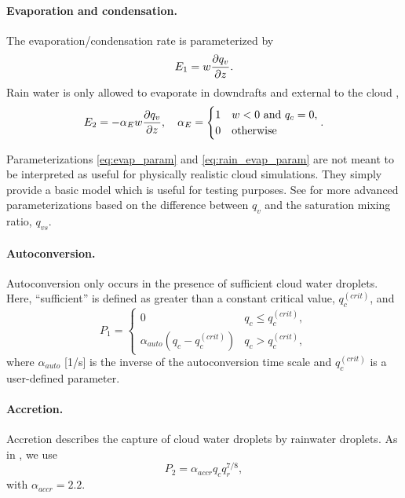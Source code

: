   
\paragraph{Evaporation and condensation.}
The evaporation/condensation rate is parameterized by \cite[eqn.~(5)]{Srivastava1967}
\begin{equation}\label{eq:evap_param}
  E_1 = w\frac{\partial q_v }{\partial z}.
\end{equation}
Rain water is only allowed to evaporate in downdrafts and external to the cloud  \cite[eqn.~(10)]{Srivastava1967},
\begin{equation}\label{eq:rain_evap_param}
  E_2 = -\alpha_E w \frac{\partial q_v }{\partial z}, \quad \alpha_E = \begin{cases} 1 & w<0 \text{ and } q_c = 0,\\
 0 & \text{otherwise}  
 \end{cases}.
\end{equation}

\begin{rem}
Parameterizations \eqref{eq:evap_param} and \eqref{eq:rain_evap_param} are not meant to be interpreted as useful for physically realistic cloud simulations. 
They simply provide a basic model which is useful for testing purposes.
See \cite{SoongOgura1973,KlempWilhelmson1978} for more advanced parameterizations based on the difference between $q_v$ and the saturation mixing ratio, $q_{vs}$.
\end{rem}

\paragraph{Autoconversion.} Autoconversion only occurs in the presence of sufficient cloud water droplets.
Here, ``sufficient'' is defined as greater than a constant critical value, $q_c^{(crit)}$, and \cite[eqn.~(12)]{Srivastava1967}
\begin{equation}
  P_1 = \begin{cases}
    0 & q_c \le q_c^{(crit)}, \\
    \alpha_{auto}(q_c - q_c^{(crit)}) & q_c > q_c^{(crit)},
  \end{cases}
\end{equation}
where $\alpha_{auto}$ [1/s] is the inverse of the autoconversion time scale and $q_c^{(crit)}$ is a user-defined parameter.

\paragraph{Accretion.} Accretion describes the capture of cloud water droplets by rainwater droplets.
As in \cite{SoongOgura1973,KlempWilhelmson1978}, we use
\begin{equation}
  P_2 = \alpha_{accr}q_cq_r^{7/8},
\end{equation}
with $\alpha_{accr} = 2.2$.

